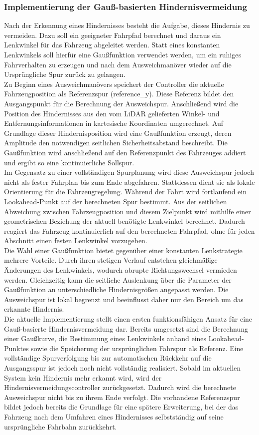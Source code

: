 \subsubsection{Implementierung der Gauß-basierten Hindernisvermeidung}
Nach der Erkennung eines Hindernisses besteht die Aufgabe, dieses Hindernis zu vermeiden. Dazu soll ein geeigneter Fahrpfad berechnet und daraus ein Lenkwinkel für das Fahrzeug abgeleitet werden. Statt eines konstanten Lenkwinkels soll hierfür eine Gaußfunktion verwendet werden, um ein ruhiges Fahrverhalten zu erzeugen und nach dem Ausweichmanöver wieder auf die Ursprüngliche Spur zurück zu gelangen.
\\
Zu Beginn eines Ausweichmanövers speichert der Controller die aktuelle Fahrzeugposition als Referenzspur (reference\_y). Diese Referenz bildet den Ausgangspunkt für die Berechnung der Ausweichspur. Anschließend wird die Position des Hindernisses aus den vom LiDAR gelieferten Winkel- und Entfernungsinformationen in kartesische Koordinaten umgerechnet. Auf Grundlage dieser Hindernisposition wird eine Gaußfunktion erzeugt, deren Amplitude den notwendigen seitlichen Sicherheitsabstand beschreibt. Die Gaußfunktion wird anschließend auf den Referenzpunkt des Fahrzeuges addiert und ergibt so eine kontinuierliche Sollspur.
\\
Im Gegensatz zu einer vollständigen Spurplanung wird diese Ausweichspur jedoch nicht als fester Fahrplan bis zum Ende abgefahren. Stattdessen dient sie als lokale Orientierung für die Fahrzeugregelung. Während der Fahrt wird fortlaufend ein Lookahead-Punkt auf der berechneten Spur bestimmt. Aus der seitlichen Abweichung zwischen Fahrzeugposition und diesem Zielpunkt wird mithilfe einer geometrischen Beziehung der aktuell benötigte Lenkwinkel berechnet. Dadurch reagiert das Fahrzeug kontinuierlich auf den berechneten Fahrpfad, ohne für jeden Abschnitt einen festen Lenkwinkel vorzugeben.
\\
Die Wahl einer Gaußfunktion bietet gegenüber einer konstanten Lenkstrategie mehrere Vorteile. Durch ihren stetigen Verlauf entstehen gleichmäßige Änderungen des Lenkwinkels, wodurch abrupte Richtungswechsel vermieden werden. Gleichzeitig kann die seitliche Auslenkung über die Parameter der Gaußfunktion an unterschiedliche Hindernisgrößen angepasst werden. Die Ausweichspur ist lokal begrenzt und beeinflusst daher nur den Bereich um das erkannte Hindernis.
\\
Die aktuelle Implementierung stellt einen ersten funktionsfähigen Ansatz für eine Gauß-basierte Hindernisvermeidung dar. Bereits umgesetzt sind die Berechnung einer Gaußkurve, die Bestimmung eines Lenkwinkels anhand eines Lookahead-Punktes sowie die Speicherung der ursprünglichen Fahrspur als Referenz. Eine vollständige Spurverfolgung bis zur automatischen Rückkehr auf die Ausgangsspur ist jedoch noch nicht vollständig realisiert. Sobald im aktuellen System kein Hindernis mehr erkannt wird, wird der Hindernisvermeidungscontroller zurückgesetzt. Dadurch wird die berechnete Ausweichspur nicht bis zu ihrem Ende verfolgt. Die vorhandene Referenzspur bildet jedoch bereits die Grundlage für eine spätere Erweiterung, bei der das Fahrzeug nach dem Umfahren eines Hindernisses selbstständig auf seine ursprüngliche Fahrbahn zurückkehrt.
